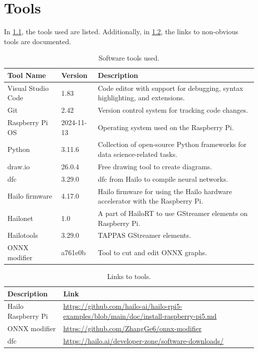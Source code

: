 \chapter{Tools}

In \cref{tab:softwaretools}, the tools used are listed. 
Additionally, in \cref{tab:softwaretoolslinks}, the links to non-obvious tools are documented.

\begin{table}[h!]
    \centering
    \begin{tabularx}{\textwidth}{|l|l|X|}
        \hline
        \textbf{Tool Name} & \textbf{Version} & \textbf{Description}   \\ \hline
        Visual Studio Code & 1.83 & Code editor with support for debugging, syntax highlighting, and extensions. \\ \hline
        Git & 2.42 & Version control system for tracking code changes. \\ \hline
        Raspberry Pi OS & 2024-11-13 & Operating system used on the Raspberry Pi. \\ \hline
        Python & 3.11.6 & Collection of open-source Python frameworks for data science-related tasks. \\ \hline
        draw.io & 26.0.4 & Free drawing tool to create diagrams. \\ \hline
        \acrlong{dfc} & 3.29.0 & \acrlong{dfc} from Hailo to compile neural networks. \\ \hline
        Hailo firmware & 4.17.0 & Hailo firmware for using the Hailo hardware accelerator with the Raspberry Pi. \\ \hline
        Hailonet & 1.0 & A part of HailoRT to use GStreamer elements on Raspberry Pi. \\ \hline
        Hailotools & 3.29.0 & TAPPAS GStreamer elements. \\ \hline
        ONNX modifier & a761e0b & Tool to cut and edit ONNX graphs. \\ \hline
    \end{tabularx}
    \caption{Software tools used.}
    \label{tab:softwaretools}
\end{table}

\begin{table}[h!]
    \centering
    \begin{tabularx}{\textwidth}{|l|X|}
        \hline
        \textbf{Description} & \textbf{Link} \\ \hline
        Hailo Raspberry Pi & \url{https://github.com/hailo-ai/hailo-rpi5-examples/blob/main/doc/install-raspberry-pi5.md} \\ \hline
        ONNX modifier & \url{https://github.com/ZhangGe6/onnx-modifier} \\ \hline
        \acrlong{dfc} & \url{https://hailo.ai/developer-zone/software-downloads/} \\ \hline
    \end{tabularx}
    \caption{Links to tools.}
    \label{tab:softwaretoolslinks}
\end{table}

